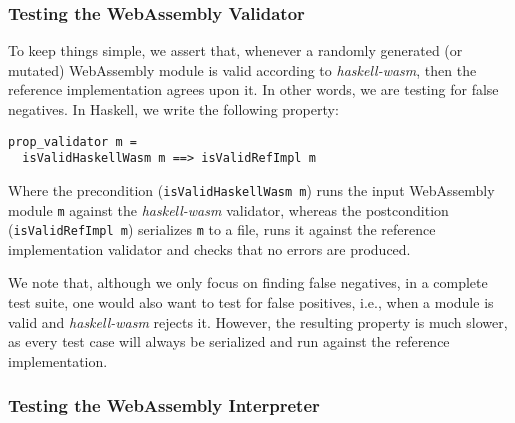 \documentclass[sigconf, anonymous, review]{acmart}
\begin{document}

\subsubsection{Testing the WebAssembly Validator}

To keep things simple, we assert that, whenever a randomly generated (or
mutated) WebAssembly module is valid according to \textit{haskell-wasm}, then
the reference implementation agrees upon it.
%
In other words, we are testing for false negatives.
%
In Haskell, we write the following property:

\begin{verbatim}
prop_validator m =
  isValidHaskellWasm m ==> isValidRefImpl m
\end{verbatim}

Where the precondition (\texttt{isValidHaskellWasm m}) runs the input WebAssembly
module \texttt{m} against the \textit{haskell-wasm} validator, whereas the
postcondition (\texttt{isValidRefImpl m}) serializes \texttt{m} to a file, runs it
against the reference implementation validator and checks that no errors are
produced.

We note that, although we only focus on finding false negatives, in a complete
test suite, one would also want to test for false positives, i.e., when a module
is valid and \textit{haskell-wasm} rejects it.
%
%
However, the resulting property is much slower, as every test case will always
be serialized and run against the reference implementation.




\subsubsection{Testing the WebAssembly Interpreter}
\end{document}
